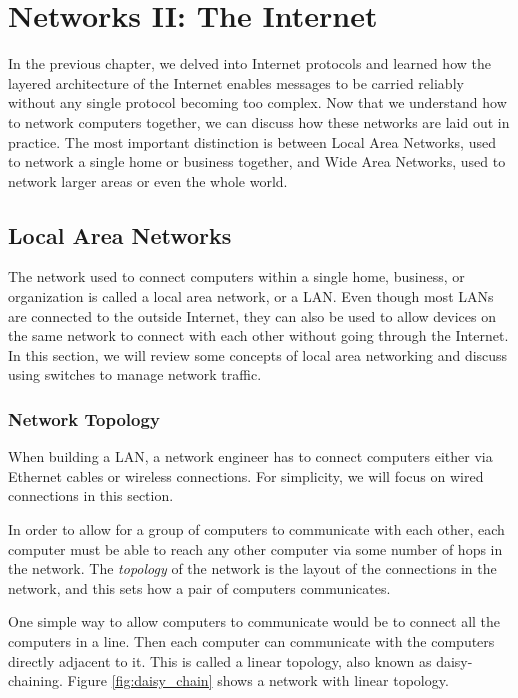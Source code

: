 \chapter{Networks II: The Internet}

In the previous chapter, we delved into Internet protocols and learned how the layered architecture of the Internet enables messages to be carried reliably without any single protocol becoming too complex. Now that we understand how to network computers together, we can discuss how these networks are laid out in practice. The most important distinction is between Local Area Networks, used to network a single home or business together, and Wide Area Networks, used to network larger areas or even the whole world.

\section{Local Area Networks}

The network used to connect computers within a single home, business, or organization is called a local area network, or a LAN. Even though most LANs are connected to the outside Internet, they can also be used to allow devices on the same network to connect with each other without going through the Internet. In this section, we will review some concepts of local area networking and discuss using switches to manage network traffic.

\subsection{Network Topology}

When building a LAN, a network engineer has to connect computers either via Ethernet cables or wireless connections. For simplicity, we will focus on wired connections in this section.

In order to allow for a group of computers to communicate with each other, each computer must be able to reach any other computer via some number of hops in the network. The \emph{topology} of the network is the layout of the connections in the network, and this sets how a pair of computers communicates. 

One simple way to allow computers to communicate would be to connect all the computers in a line. Then each computer can communicate with the computers directly adjacent to it. This is called a linear topology, also known as daisy-chaining. Figure \ref{fig:daisy_chain} shows a network with linear topology.

